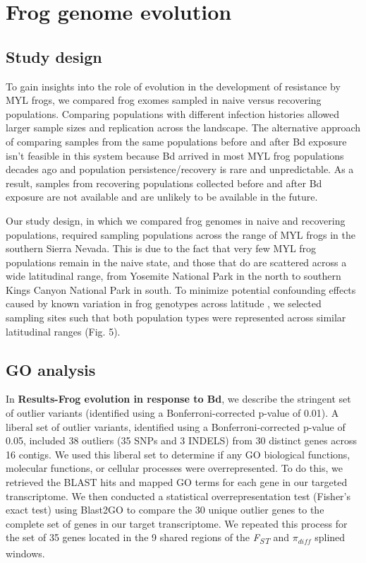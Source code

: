 \documentclass[9pt,twoside,lineno]{pnas-new-SI}
\begin{document}
\hypertarget{frog-genome-evolution-2}{%
\section{Frog genome evolution}\label{frog-genome-evolution-2}}

\hypertarget{study-design}{%
\subsection{Study design}\label{study-design}}

To gain insights into the role of evolution in the development of
resistance by MYL frogs, we compared frog exomes sampled in naive versus
recovering populations. Comparing populations with different infection
histories allowed larger sample sizes and replication across the
landscape. The alternative approach of comparing samples from the same
populations before and after Bd exposure isn't feasible in this system
because Bd arrived in most MYL frog populations decades ago and
population persistence/recovery is rare and unpredictable. As a result,
samples from recovering populations collected before and after Bd
exposure are not available and are unlikely to be available in the
future.

Our study design, in which we compared frog genomes in naive and
recovering populations, required sampling populations across the range
of MYL frogs in the southern Sierra Nevada. This is due to the fact that
very few MYL frog populations remain in the naive state, and those that
do are scattered across a wide latitudinal range, from Yosemite National
Park in the north to southern Kings Canyon National Park in south. To
minimize potential confounding effects caused by known variation in frog
genotypes across latitude \citep{byrne2023}, we selected sampling sites
such that both population types were represented across similar
latitudinal ranges (Fig. 5).

\hypertarget{go-analysis}{%
\subsection{GO analysis}\label{go-analysis}}

In \textbf{Results-Frog evolution in response to Bd}, we describe the
stringent set of outlier variants (identified using a
Bonferroni-corrected p-value of 0.01). A liberal set of outlier
variants, identified using a Bonferroni-corrected p-value of 0.05,
included 38 outliers (35 SNPs and 3 INDELS) from 30 distinct genes
across 16 contigs. We used this liberal set to determine if any GO
biological functions, molecular functions, or cellular processes were
overrepresented. To do this, we retrieved the BLAST hits and mapped GO
terms for each gene in our targeted transcriptome. We then conducted a
statistical overrepresentation test (Fisher's exact test) using Blast2GO
\citep{conesa2005} to compare the 30 unique outlier genes to the
complete set of genes in our target transcriptome. We repeated this
process for the set of 35 genes located in the 9 shared regions of the
\emph{F\textsubscript{ST}} and \(\pi_{diff}\) splined windows.
\end{document}
